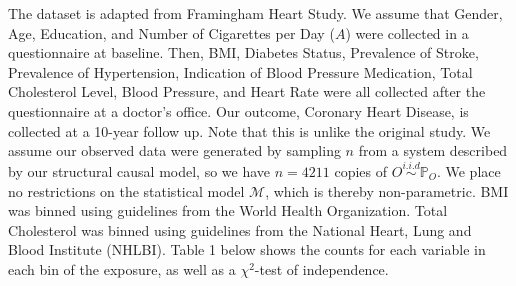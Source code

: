 \documentclass[]{article}
\begin{document}
The dataset is adapted from Framingham Heart Study. We assume that
Gender, Age, Education, and Number of Cigarettes per Day (\(A\)) were
collected in a questionnaire at baseline. Then, BMI, Diabetes Status,
Prevalence of Stroke, Prevalence of Hypertension, Indication of Blood
Pressure Medication, Total Cholesterol Level, Blood Pressure, and Heart
Rate were all collected after the questionnaire at a doctor's office.
Our outcome, Coronary Heart Disease, is collected at a 10-year follow
up. Note that this is unlike the original study. We assume our observed
data were generated by sampling \(n\) from a system described by our
structural causal model, so we have \(n = 4211\) copies of
\(O\overset{i.i.d}\sim \mathbb{P}_O\). We place no restrictions on the
statistical model \(\mathcal{M}\), which is thereby non-parametric. BMI
was binned using guidelines from the World Health Organization. Total
Cholesterol was binned using guidelines from the National Heart, Lung
and Blood Institute (NHLBI). Table 1 below shows the counts for each
variable in each bin of the exposure, as well as a \(\chi^2\)-test of
independence.
\end{document}
